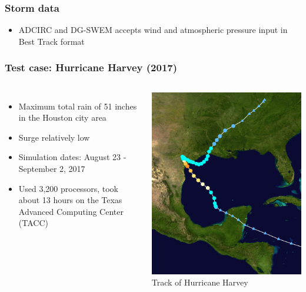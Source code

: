 \documentclass[10pt]{oden_beamer}
\begin{document}
\begin{frame}
  \frametitle{Storm data}
  \begin{itemize}
  \item ADCIRC and DG-SWEM accepts wind and atmospheric pressure input in Best Track format
  \end{itemize}
\end{frame}

\begin{frame}
  \frametitle{Test case: Hurricane Harvey (2017)}
  \begin{columns}
  \begin{itemize}
  \item Maximum total rain of 51 inches in the Houston city area
  \item Surge relatively low
  \item Simulation dates: August 23 - September 2, 2017
  \item Used 3,200 processors, took about 13 hours on the Texas Advanced Computing Center (TACC)
  \end{itemize}

  \centering
  \includegraphics[width=0.8\linewidth]{harvey_cropped.png} \\
  \footnotesize Track of Hurricane Harvey
  \end{columns}

\end{frame}
\end{document}

